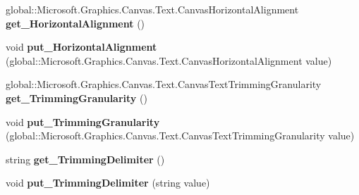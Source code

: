 \begin{DoxyCompactItemize}
\item 
\mbox{\label{interface_microsoft_1_1_graphics_1_1_canvas_1_1_text_1_1_i_canvas_text_format_a8b95906a63861d6e560977db8b154cb6}} 
global\+::\+Microsoft.\+Graphics.\+Canvas.\+Text.\+Canvas\+Horizontal\+Alignment {\bfseries get\+\_\+\+Horizontal\+Alignment} ()
\item 
\mbox{\label{interface_microsoft_1_1_graphics_1_1_canvas_1_1_text_1_1_i_canvas_text_format_aa35da0e8e55810f44b20d72a857dc479}} 
void {\bfseries put\+\_\+\+Horizontal\+Alignment} (global\+::\+Microsoft.\+Graphics.\+Canvas.\+Text.\+Canvas\+Horizontal\+Alignment value)
\item 
\mbox{\label{interface_microsoft_1_1_graphics_1_1_canvas_1_1_text_1_1_i_canvas_text_format_a2db054de408def815030a08cc7d260fb}} 
global\+::\+Microsoft.\+Graphics.\+Canvas.\+Text.\+Canvas\+Text\+Trimming\+Granularity {\bfseries get\+\_\+\+Trimming\+Granularity} ()
\item 
\mbox{\label{interface_microsoft_1_1_graphics_1_1_canvas_1_1_text_1_1_i_canvas_text_format_a8024f0e16f1e45d41135c2f6848b2dca}} 
void {\bfseries put\+\_\+\+Trimming\+Granularity} (global\+::\+Microsoft.\+Graphics.\+Canvas.\+Text.\+Canvas\+Text\+Trimming\+Granularity value)
\item 
\mbox{\label{interface_microsoft_1_1_graphics_1_1_canvas_1_1_text_1_1_i_canvas_text_format_a465c8b167bfb7c8dd79219d09f74a2ab}} 
string {\bfseries get\+\_\+\+Trimming\+Delimiter} ()
\item 
\mbox{\label{interface_microsoft_1_1_graphics_1_1_canvas_1_1_text_1_1_i_canvas_text_format_ad1fbe65d5abfd8c79af18f07b497a1fd}} 
void {\bfseries put\+\_\+\+Trimming\+Delimiter} (string value)
\item 
\mbox{\label{interface_microsoft_1_1_graphics_1_1_canvas_1_1_text_1_1_i_canvas_text_format_aa876e799c133cf8e68453bded95d54a5}} 

\end{DoxyCompactItemize}
